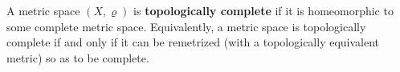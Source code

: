 A metric space $(X, \varrho)$ is \textbf{topologically complete} if it is homeomorphic to some complete metric space. Equivalently, a metric space is topologically complete if and only if it can be remetrized (with a topologically equivalent metric) so as to be complete.
